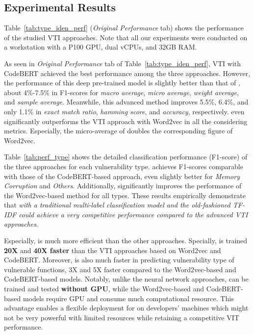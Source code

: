 \subsection{Experimental Results}
\label{sec:results}


Table~\ref{tab:type_iden_perf} (\textit{Original Performance} tab) shows the performance of the studied VTI approaches. 
Note that all our experiments were conducted on a workstation with a P100 GPU, dual vCPUs, and 32GB RAM.


 

As seen in \textit{Original Performance} tab of Table~\ref{tab:type_iden_perf}, VTI with CodeBERT achieved the best performance among the three approaches. 
%
%
However, the performance of this deep pre-trained model is slightly better than that of \base, about 4\%-7.5\% in F1-scores for \textit{macro average}, \textit{micro average}, \textit{weight average}, and \textit{sample average}. Meanwhile, this advanced method improves 5.5\%, 6.4\%, and only 1.1\% in \textit{exact match ratio}, \textit{hamming score}, and \textit{accuracy}, respectively. \base even significantly outperforms the VTI approach with Word2vec in all the considering metrics. Especially, the micro-average of \base doubles the corresponding figure of Word2vec. 
%
%



Table~\ref{tab:perf_type} shows the detailed classification performance (F1-score) of the three approaches for each vulnerability type. \base achieves F1-scores comparable with those of the CodeBERT-based approach, even slightly better for \textit{Memory Corruption} and \textit{Others}. Additionally, \base significantly improves the performance of the Word2vec-based method for all types. 
%
%
These results empirically demonstrate that \textit{\base with a traditional multi-label classification model and the old-fashioned TF-IDF could achieve a very competitive performance compared to the advanced VTI approaches}.

Especially, \base is much more efficient than the other approaches. Specially, \base is trained \textbf{20X} and \textbf{40X faster} than the VTI approaches based on Word2vec and CodeBERT. Moreover, \base is also much faster in predicting vulnerability type of vulnerable functions, 3X and 5X faster compared to the Word2vec-based and CodeBERT-based models. Notably, unlike the neural network approaches, \base can be trained and tested \textbf{without GPU}, while the Word2vec-based and CodeBERT-based models require GPU and consume much computational resource. This advantage enables a flexible deployment for \base on developers' machines which might not be very powerful with limited resources while retaining a competitive VIT performance.








